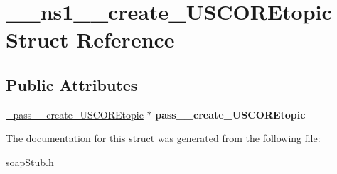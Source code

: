 \hypertarget{struct____ns1____create__USCOREtopic}{
\section{\_\-\_\-ns1\_\-\_\-create\_\-USCOREtopic Struct Reference}
\label{struct____ns1____create__USCOREtopic}
}
\subsection*{Public Attributes}
\begin{DoxyCompactItemize}
\item 
\hypertarget{struct____ns1____create__USCOREtopic_a5884a88dfe595bfb1711f05cd3e5d136}{
\hyperlink{class__pass____create__USCOREtopic}{\_\-pass\_\-\_\-create\_\-USCOREtopic} $\ast$ {\bfseries pass\_\-\_\-create\_\-USCOREtopic}}
\label{struct____ns1____create__USCOREtopic_a5884a88dfe595bfb1711f05cd3e5d136}

\end{DoxyCompactItemize}


The documentation for this struct was generated from the following file:\begin{DoxyCompactItemize}
\item 
soapStub.h\end{DoxyCompactItemize}
